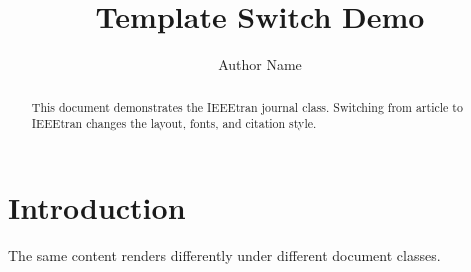 \documentclass[journal]{IEEEtran}
\begin{document}
\title{Template Switch Demo}
\author{Author Name}
\maketitle

\begin{abstract}
This document demonstrates the IEEEtran journal class.
Switching from article to IEEEtran changes the layout, fonts, and citation style.
\end{abstract}

\section{Introduction}
The same content renders differently under different document classes.
\end{document}
